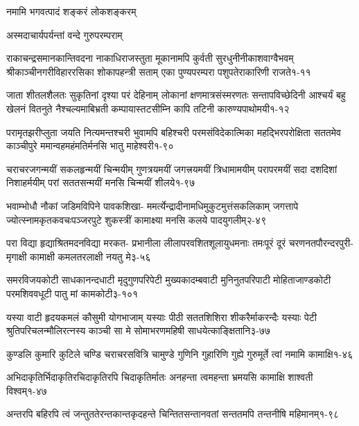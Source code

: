 {नमामि भगवत्पादं शङ्करं लोकशङ्करम्}

{अस्मदाचार्यपर्यन्तां वन्दे गुरुपरम्पराम्}



\annofourlineindentedshloka
{राकाचन्द्रसमानकान्तिवदना नाकाधिराजस्तुता}
{मूकानामपि कुर्वती सुरधुनीनीकाशवाग्वैभवम्}
{श्रीकाञ्चीनगरीविहाररसिका शोकापहन्त्री सताम्}
{एका पुण्यपरम्परा पशुपतेराकारिणी राजते}{१-११}

\annofourlineindentedshloka
{जाता शीतलशैलतः सुकृतिनां दृश्या परं देहिनाम्}
{लोकानां क्षणमात्रसंस्मरणतः सन्तापविच्छेदिनी}
{आश्चर्यं बहु खेलनं वितनुते नैश्चल्यमाबिभ्रती}
{कम्पायास्तटसीम्नि कापि तटिनी कारुण्यपाथोमयी}{१-१२}

\annofourlineindentedshloka
{परामृतझरीप्लुता जयति नित्यमन्तश्चरी}
{भुवामपि बहिश्चरी परमसंविदेकात्मिका}
{महद्भिरपरोक्षिता सततमेव काञ्चीपुरे}
{ममान्वहमहंमतिर्मनसि भातु माहेश्वरी}{१-९०}

\annofourlineindentedshloka
{चराचरजगन्मयीं सकलहृन्मयीं चिन्मयीम्}
{गुणत्रयमयीं जगत्त्रयमयीं त्रिधामामयीम्}
{परापरमयीं सदा दशदिशां निशाहर्मयीम्}
{परां सततसन्मयीं मनसि चिन्मयीं शीलये}{१-९७}

\annofourlineindentedshloka
{भवाम्भोधौ नौकां जडिमविपिने पावकशिखा-}
{ममर्त्येन्द्रादीनामधिमुकुटमुत्तंसकलिकाम्}
{जगत्तापे ज्योत्स्नामकृतकवचःपञ्जरपुटे}
{शुकस्त्रीं कामाक्ष्या मनसि कलये पादयुगलीम्}{२-४९}

\annofourlineindentedshloka
{परा विद्या हृद्याश्रितमदनविद्या मरकत-}
{प्रभानीला लीलापरवशितशूलायुधमनाः}
{तमःपूरं दूरं चरणनतपौरन्दरपुरी-}
{मृगाक्षी कामाक्षी कमलतरलाक्षी नयतु मे}{३-५६}

\annofourlineindentedshloka
{समरविजयकोटी साधकानन्दधाटी}
{मृदुगुणपरिपेटी मुख्यकादम्बवाटी}
{मुनिनुतपरिपाटी मोहिताजाण्डकोटी}
{परमशिववधूटी पातु मां कामकोटी}{३-१०१}

\annofourlineindentedshloka
{यस्या वाटी हृदयकमलं कौसुमी योगभाजाम्}
{यस्याः पीठी सततशिशिरा शीकरैर्माकरन्दैः}
{यस्याः पेटी श्रुतिपरिचलन्मौलिरत्नस्य काञ्ची}
{सा मे सोमाभरणमहिषी साधयेत्काङ्क्षितानि}{३-७७}

\annotwolineshloka
{कुण्डलि कुमारि कुटिले चण्डि चराचरसवित्रि चामुण्डे}
{गुणिनि गुहारिणि गुह्ये गुरुमूर्ते त्वां नमामि कामाक्षि}{१-४६}

\annotwolineshloka
{अभिदाकृतिर्भिदाकृतिरचिदाकृतिरपि चिदाकृतिर्मातः}
{अनहन्ता त्वमहन्ता भ्रमयसि कामाक्षि शाश्वती विश्वम्}{१-४७}

\annotwolineshloka
{अन्तरपि बहिरपि त्वं जन्तुततेरन्तकान्तकृदहन्ते}
{चिन्तितसन्तानवतां सन्ततमपि तन्तनीषि महिमानम्}{१-९८}

